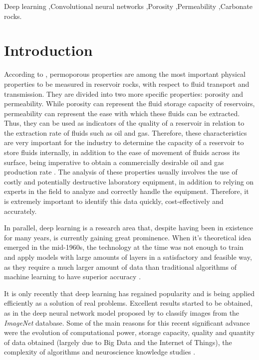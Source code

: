 \documentclass[a4paper,fleqn]{cas-sc}
\begin{document}
\begin{keywords}
Deep learning \sep Convolutional neural networks \sep Porosity \sep Permeability \sep Carbonate rocks.
\end{keywords}

\maketitle 

\printcredits

\doublespacing


\section{Introduction}
\label{intro}
According to \cite{Buryakovsky2012}, permoporous properties are among the most important physical properties to be measured in reservoir rocks, with respect to fluid transport and transmission. They are divided into two more specific properties: porosity and permeability.
While porosity can represent the fluid storage capacity of reservoirs, permeability can represent the ease with which these fluids can be extracted. Thus, they can be used as indicators of the quality of a reservoir in relation to the extraction rate of fluids such as oil and gas.
Therefore, these characteristics are very important for the industry to determine the capacity of a reservoir to store fluids internally, in addition to the ease of movement of fluids across its surface, being imperative to obtain a commercially desirable oil and gas production rate \cite{Tembely2020, VALENTIN2019474}. The analysis of these properties usually involves the use of costly and potentially destructive laboratory equipment, in addition to relying on experts in the field to analyze and correctly handle the equipment. Therefore, it is extremely important to identify this data quickly, cost-effectively and accurately.

In parallel, deep learning is a research area that, despite having been in existence for many years, is currently gaining great prominence. When it's theoretical idea emerged in the mid-1960s, the technology at the time was not enough to train and apply models with large amounts of layers in a satisfactory and feasible way, as they require a much larger amount of data than traditional algorithms of machine learning to have superior accuracy \cite{Schmidhuber2015, wason2018}.

It is only recently that deep learning has regained popularity and is being applied efficiently as a solution of real problems. Excellent results started to be obtained, as in the deep neural network model proposed by \cite{Krizhevsky2012} to classify images from the \textit{ImageNet} database. Some of the main reasons for this recent significant advance were the evolution of computational power, storage capacity, quality and quantity of data obtained (largely due to Big Data and the Internet of Things), the complexity of algorithms and neuroscience knowledge studies \cite{arel2010, chollet2017deep}.
\end{document}
